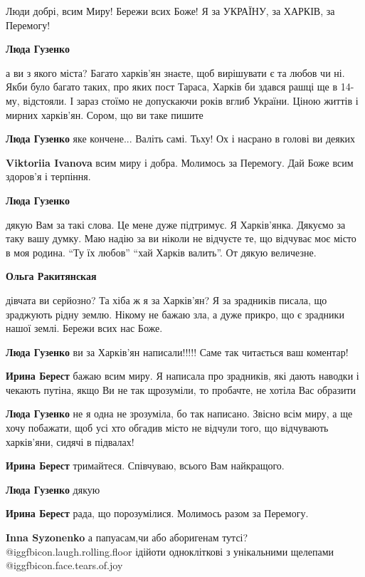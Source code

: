 \begin{itemize}
\begin{itemize}

Люди добрі, всим Миру! Бережи всих Боже! Я за УКРАЇНУ, за ХАРКІВ, за Перемогу!

\textbf{Люда Гузенко} 

а ви з якого міста? Багато харків'ян знаєте, щоб вирішувати є та любов чи ні.
Якби було багато таких, про яких пост Тараса, Харків би здався рашці ще в
14-му, відстояли. І зараз стоїмо не допускаючи років вглиб України. Ціною
життів і мирних харків'ян. Сором, що ви таке пишите

\textbf{Люда Гузенко} яке кончене... Валіть самі. Тьху! Ох і насрано в голові ви деяких

\textbf{Viktoriia Ivanova} всим миру і добра. Молимось за Перемогу. Дай Боже всим здоров'я і терпіння.

\textbf{Люда Гузенко} 

дякую Вам за такі слова. Це мене дуже підтримує. Я Харків'янка. Дякуємо за таку
вашу думку. Маю надію за ви ніколи не відчуєте те, що відчуває моє місто в моя
родина. \enquote{Ту їх любов} \enquote{хай Харків валить}. От дякую величезне.

\textbf{Ольга Ракитянская} 

дівчата ви серйозно? Та хіба ж я за Харків'ян? Я за зрадників писала, що
зраджують рідну землю. Нікому не бажаю зла, а дуже прикро, що є зрадники нашої
землі. Бережи всих нас Боже.

\textbf{Люда Гузенко} ви за Харків'ян написали!!!!! Саме так читається ваш коментар!

\textbf{Ирина Берест} бажаю всим миру. Я написала про зрадників, які дають наводки і чекають путіна, якщо Ви не так щрозуміли, то пробачте, не хотіла Вас образити

\textbf{Люда Гузенко} не я одна не зрозуміла, бо так написано. Звісно всім миру, а ще хочу побажати, щоб усі хто обгадив місто не відчули того, що відчувають харків'яни, сидячі в підвалах!

\textbf{Ирина Берест} тримайтеся. Співчуваю, всього Вам найкращого.

\textbf{Люда Гузенко} дякую

\textbf{Ирина Берест} рада, що порозумілися. Молимось разом за Перемогу.

\textbf{Inna Syzonenko} а папуасам,чи або аборигенам тутсі? @igg{fbicon.laugh.rolling.floor}  ідійоти однокліткові з унікальними щелепами @igg{fbicon.face.tears.of.joy} 


\end{itemize}
\end{itemize}
